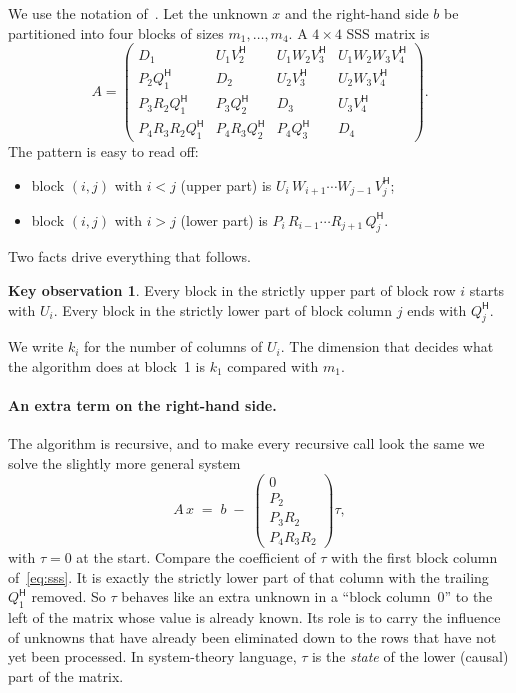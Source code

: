 \documentclass[11pt]{article}
\newcommand{\ct}{^{\mathsf H}}            %
\theoremstyle{definition}
\newtheorem{observation}{Key observation}
\begin{document}
We use the notation of~\cite[Section~5]{CDGPV02}. Let the unknown $x$ and the
right-hand side $b$ be partitioned into four blocks of sizes $m_1,\dots,m_4$.
A $4\times4$ SSS matrix is
\begin{equation}
\label{eq:sss}
A =
\left(\begin{array}{c|c|c|c}
D_1 & U_1V_2\ct & U_1W_2V_3\ct & U_1W_2W_3V_4\ct \\[2pt]\hline
P_2Q_1\ct & D_2 & U_2V_3\ct & U_2W_3V_4\ct \\[2pt]\hline
P_3R_2Q_1\ct & P_3Q_2\ct & D_3 & U_3V_4\ct \\[2pt]\hline
P_4R_3R_2Q_1\ct & P_4R_3Q_2\ct & P_4Q_3\ct & D_4
\end{array}\right).
\end{equation}
The pattern is easy to read off:
\begin{itemize}
  \item block $(i,j)$ with $i<j$ (upper part) is $U_i\,W_{i+1}\cdots W_{j-1}\,V_j\ct$;
  \item block $(i,j)$ with $i>j$ (lower part) is $P_i\,R_{i-1}\cdots R_{j+1}\,Q_j\ct$.
\end{itemize}
Two facts drive everything that follows.
\begin{observation}
\label{obs:sss-row}
Every block in the strictly upper part of block row $i$ starts with $U_i$.
Every block in the strictly lower part of block column $j$ ends with $Q_j\ct$.
\end{observation}
We write $k_i$ for the number of columns of $U_i$. The dimension that decides
what the algorithm does at block~1 is $k_1$ compared with $m_1$.

\paragraph{An extra term on the right-hand side.}
The algorithm is recursive, and to make every recursive call look the same we
solve the slightly more general system
\begin{equation}
\label{eq:sss-system}
A\,x \;=\; b \;-\;
\left(\begin{array}{c} 0\\[2pt]\hline P_2\\[2pt]\hline P_3R_2\\[2pt]\hline P_4R_3R_2 \end{array}\right)\tau ,
\end{equation}
with $\tau=0$ at the start. Compare the coefficient of $\tau$ with the first
block column of~\eqref{eq:sss}. It is exactly the strictly lower part of that
column with the trailing $Q_1\ct$ removed. So $\tau$ behaves like an extra
unknown in a ``block column~0'' to the left of the matrix whose value is
already known. Its role is to carry the influence of unknowns that have
already been eliminated down to the rows that have not yet been processed. In
system-theory language, $\tau$ is the \emph{state} of the lower (causal) part of
the matrix.
\end{document}
